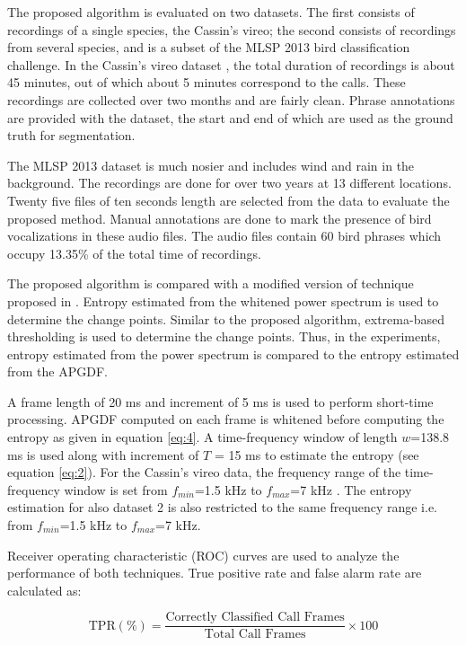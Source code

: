 \documentclass[a4paper]{article}
\begin{document}
The proposed algorithm is evaluated on two datasets. The first consists of
recordings of a single species, the Cassin's vireo; the second consists of
recordings from several species, and is a subset of the MLSP 2013 bird
classification challenge.
In the Cassin's vireo dataset \cite{data1}, the total duration
of recordings is about 45 minutes, out of which about 5 minutes correspond to
the calls. These recordings are collected over two months and are fairly clean.
Phrase annotations are provided with the dataset, the start and end of which
are used as the ground truth for segmentation. 

The MLSP 2013 dataset \cite{data2} is much nosier and includes wind and rain in
the background. The recordings are done for over two years at 13 different
locations. Twenty five files of ten seconds length are selected from the data to
evaluate the proposed method.  
Manual annotations are done to mark the presence
of bird vocalizations in these audio files. The audio files contain 60 bird phrases which occupy 13.35\% of the total time of recordings.  


The proposed algorithm is compared with a modified version of technique proposed
in \cite{wang2013}. Entropy estimated from the whitened power spectrum is used
to determine the change points. Similar to the proposed algorithm, extrema-based
thresholding is used to determine the change points. Thus, in the experiments,
entropy estimated from the power spectrum is compared to the entropy estimated
from the APGDF.
 
A frame length of 20 ms and increment of 5 ms is used to perform short-time
processing. APGDF computed on each frame is whitened before computing the
entropy as given in equation \ref{eq:4}. A time-frequency window of length $w$=138.8 ms
is used along with increment of $T$ = 15 ms to estimate the entropy (see
equation \ref{eq:2}). For the Cassin's vireo data, the frequency range of the
time-frequency window is set from $f_{min}$=1.5 kHz to $f_{max}$=7 kHz
\cite{wang2013}. The entropy estimation for also dataset 2 is also restricted to the same frequency range i.e. from $f_{min}$=1.5 kHz to $f_{max}$=7 kHz. 

Receiver operating characteristic (ROC) curves are used to analyze the
performance of both techniques. True positive rate and false alarm rate are
calculated as:

\begin{equation}
\text{TPR} (\%)=\frac{\text{Correctly Classified Call Frames}} {\text{Total Call Frames}} \times 100 
\end{equation}
\end{document}
